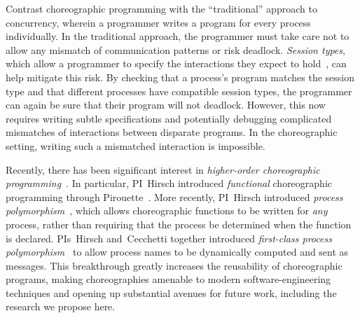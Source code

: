Contrast choreographic programming with the ``traditional'' approach to concurrency, wherein a programmer writes a program for every process individually.
In the traditional approach, the programmer must take care not to allow any mismatch of communication patterns or risk deadlock.
\emph{Session types}, which allow a programmer to specify the interactions they expect to hold~\cite{DeYoungCPT09,CairesP10,GayV10,Wadler12,ScalasY19}, can help mitigate this risk.
By checking that a process's program matches the session type and that different processes have compatible session types, the programmer can again be sure that their program will not deadlock.
However, this now requires writing subtle specifications and potentially debugging complicated mismatches of interactions between disparate programs.
In the choreographic setting, writing such a mismatched interaction is impossible.

Recently, there has been significant interest in \emph{higher-order choreographic programming}~\cite{GraversenHM24,GiallorenzoMP23,CruzFilipeGLMP22,HirschG22,ShenKK23,SamuelsonHC25}.
In particular, PI~Hirsch introduced \emph{functional} choreographic programming through Pirouette~\cite{HirschG22}.
More recently, PI~Hirsch introduced \emph{process polymorphism}~\cite{GraversenHM24}, which allows choreographic functions to be written for \emph{any} process, rather than requiring that the process be determined when the function is declared.
PIs~Hirsch and~Cecchetti together introduced \emph{first-class process polymorphism}~\cite{SamuelsonHC25} to allow process names to be dynamically computed and sent as messages.
This breakthrough greatly increases the reusability of choreographic programs, making choreographies amenable to modern software-engineering techniques
and opening up substantial avenues for future work, including the research we propose here.


